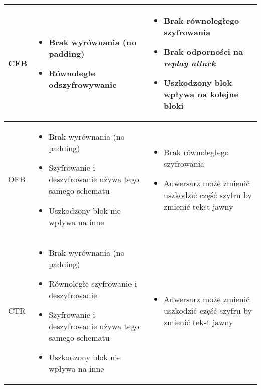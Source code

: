 \documentclass[a4paper,11pt]{article}
\theoremstyle{mytheor}
\begin{document}
\begin{table}[H]
\begin{tabular}{|p{}|p{}|p{}|}
        CFB & \begin{itemize}
            \setlength\itemsep{-0.5em}
            \item Brak wyrównania (no padding)
            \item Równoległe odszyfrowywanie
        \end{itemize} & \begin{itemize}
            \setlength\itemsep{-0.8em}
            \item Brak równoległego szyfrowania
            \item Brak odporności na \textit{replay attack}
            \item Uszkodzony blok wpływa na kolejne bloki
        \end{itemize}
        \\ \hline

        OFB & \begin{itemize}
            \setlength\itemsep{-0.5em}
            \item Brak wyrównania (no padding)
            \item Szyfrowanie i deszyfrowanie używa tego samego schematu
            \item Uszkodzony blok nie wpływa na inne
        \end{itemize} & \begin{itemize}
            \setlength\itemsep{-0.8em}
            \item Brak równoległego szyfrowania
            \item Adwersarz może zmienić uszkodzić część szyfru by zmienić tekst jawny
        \end{itemize}
        \\ \hline
        
        CTR & \begin{itemize}
            \setlength\itemsep{-0.5em}
            \item Brak wyrównania (no padding)
            \item Równoległe szyfrowanie i deszyfrowanie
            \item Szyfrowanie i deszyfrowanie używa tego samego schematu
            \item Uszkodzony blok nie wpływa na inne
        \end{itemize} & \begin{itemize}
            \setlength\itemsep{-0.8em}
            \item Adwersarz może zmienić uszkodzić część szyfru by zmienić tekst jawny
        \end{itemize}
        \\ \hline
    \end{tabular}
    \label{tab:my-table}
\end{table}
\end{document}
